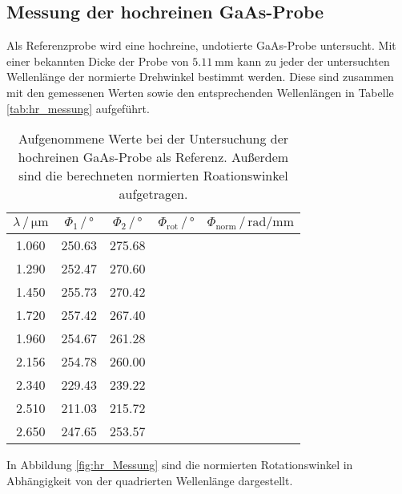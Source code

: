  \subsection{Messung der hochreinen GaAs-Probe}
 Als Referenzprobe wird eine hochreine, undotierte GaAs-Probe untersucht.
 Mit einer bekannten Dicke der Probe von $\SI{5.11}{\milli\meter}$ kann zu jeder der untersuchten 
 Wellenlänge der normierte Drehwinkel bestimmt werden. Diese sind zusammen mit den gemessenen Werten sowie den 
 entsprechenden Wellenlängen in Tabelle \ref{tab:hr_messung} aufgeführt.
 \begin{table}[H]
    \centering
    \caption{Aufgenommene Werte bei der Untersuchung der hochreinen GaAs-Probe als Referenz. Außerdem sind die 
    berechneten normierten Roationswinkel aufgetragen.}
    \label{tab:MF_Messung}
    \begin{tabular}{ccccc}
      \toprule
      $\lambda\, / \, \si{\micro\meter}$ & $\Phi_1 \, / \, \si{\degree}$ & $\Phi_2 \, / \, \si{\degree}$ & $\Phi_\text{rot} \, / \, \si{\degree}$ & $\Phi_\text{norm} \, / \, \si{\radian\per\milli\meter}$  \\
      \midrule
      1.060 & 250.63 & 275.68 &  &  \\
      1.290 & 252.47 & 270.60 &  &  \\
      1.450 & 255.73 & 270.42 &  &  \\
      1.720 & 257.42 & 267.40 &  &  \\
      1.960 & 254.67 & 261.28 &  &  \\
      2.156 & 254.78 & 260.00 &  &  \\
      2.340 & 229.43 & 239.22 &  &  \\
      2.510 & 211.03 & 215.72 &  &  \\
      2.650 & 247.65 & 253.57 &  &  \\
      \bottomrule
    \end{tabular}
   \end{table} \noindent
   In Abbildung \ref{fig:hr_Messung} sind die normierten Rotationswinkel in Abhängigkeit von der quadrierten 
   Wellenlänge dargestellt. 

